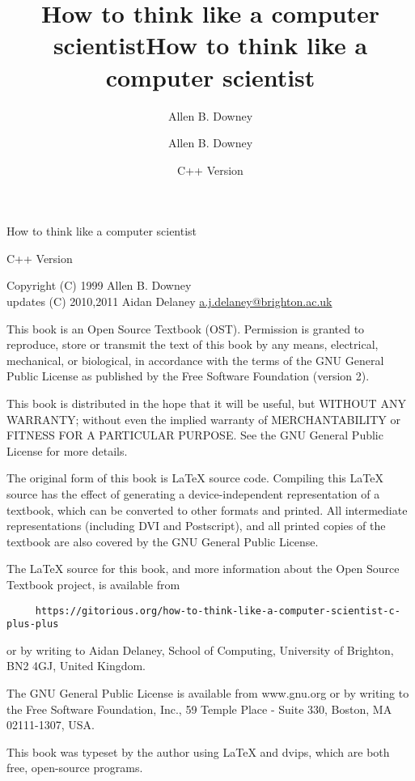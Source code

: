 \documentclass{book}
\title{How to think like a computer scientist}
\author{Allen B. Downey}
\date{}
\begin{document}
\title {How to think like a computer scientist}
\author {Allen B. Downey}
\date {C++ Version}
\maketitle

\vspace{2in}
\begin{center}
{\Large How to think like a computer scientist}

C++ Version
\vspace{0.25in}

Copyright (C) 1999  Allen B. Downey\\
updates (C) 2010,2011 Aidan Delaney \url{a.j.delaney@brighton.ac.uk}
\end{center}
\vspace{0.25in}

This book is an Open Source Textbook (OST).  Permission is
granted to reproduce, store or transmit the text of this
book by any means, electrical, mechanical, or biological,
in accordance with the terms of the GNU General Public License as
published by the Free Software Foundation (version 2).

This book is distributed in the hope that it will be useful,
but WITHOUT ANY WARRANTY; without even the implied warranty of
MERCHANTABILITY or FITNESS FOR A PARTICULAR PURPOSE.  See the GNU
General Public License for more details.

The original form of this book is LaTeX source code.
Compiling this LaTeX source has the effect of generating
a device-independent representation of a textbook, which
can be converted to other formats and printed.  All intermediate
representations (including DVI and Postscript), and all printed
copies of the textbook are also covered by the GNU General
Public License.

The LaTeX source for this book, and more information about
the Open Source Textbook project, is available from

\begin{verbatim}
     https://gitorious.org/how-to-think-like-a-computer-scientist-c-plus-plus
\end{verbatim}
%
or by writing to Aidan Delaney, School of Computing, University of Brighton, BN2 4GJ, United Kingdom.

The GNU General Public License is available from
www.gnu.org or by writing to the Free Software Foundation,
Inc., 59 Temple Place - Suite 330, Boston, MA 02111-1307, USA.

This book was typeset by the author using LaTeX and dvips,
which are both free, open-source programs.


\frontmatter
\tableofcontents

\mainmatter
















\appendix


\printindex
\end{document}
